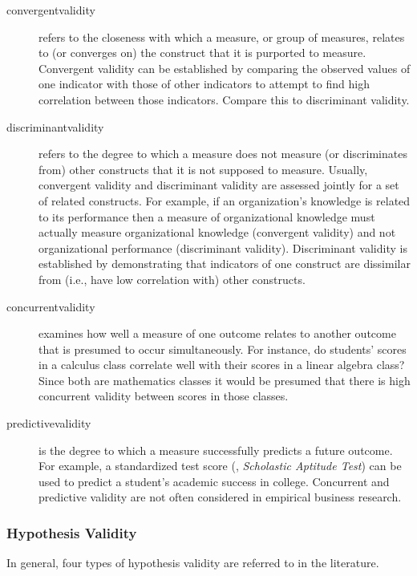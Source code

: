 \begin{description}

	\item[\Gls{convergentvalidity}] refers to the closeness with which a measure, or group of measures, relates to (or converges on) the construct that it is purported to measure. Convergent validity can be established by comparing the observed values of one indicator with those of other indicators to attempt to find high correlation between those indicators. Compare this to discriminant validity.
	
	\item[\gls{discriminantvalidity}] refers to the degree to which a measure does not measure (or discriminates from) other constructs that it is not supposed to measure. Usually, convergent validity and discriminant validity are assessed jointly for a set of related constructs. For example, if an organization's knowledge is related to its performance then a measure of organizational knowledge must actually measure organizational knowledge (convergent validity) and not organizational performance (discriminant validity). Discriminant validity is established by demonstrating that indicators of one construct are dissimilar from (i.e., have low correlation with) other constructs.

	\item[\Gls{concurrentvalidity}] examines how well a measure of one outcome relates to another outcome that is presumed to occur simultaneously. For instance, do students' scores in a calculus class correlate well with their scores in a linear algebra class? Since both are mathematics classes it would be presumed that there is high concurrent validity between scores in those classes. 
	
	\item[\Gls{predictivevalidity}] is the degree to which a measure successfully predicts a future outcome. For example, a standardized test score (\eg, \textit{Scholastic Aptitude Test}) can be used to predict a student's academic success in college. Concurrent and predictive validity are not often considered in empirical business research.

\end{description}

\subsubsection{Hypothesis Validity}

In general, four types of hypothesis validity are referred to in the literature.

